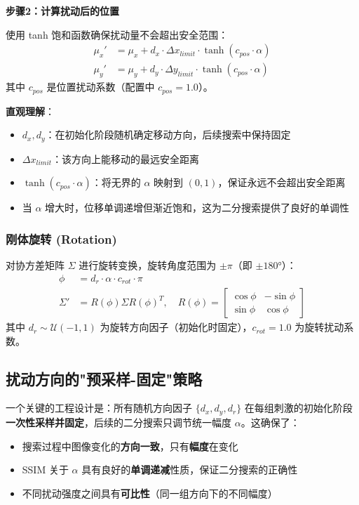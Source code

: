 \documentclass{article}
\begin{document}
\textbf{步骤2：计算扰动后的位置}

使用 tanh 饱和函数确保扰动量不会超出安全范围：
\begin{align}
\mu_x' &= \mu_x + d_x \cdot \Delta x_{limit} \cdot \tanh(c_{pos} \cdot \alpha) \\
\mu_y' &= \mu_y + d_y \cdot \Delta y_{limit} \cdot \tanh(c_{pos} \cdot \alpha)
\end{align}
其中 $c_{pos}$ 是位置扰动系数（配置中 $c_{pos} = 1.0$）。

\textbf{直观理解}：
\begin{itemize}
    \item $d_x, d_y$：在初始化阶段随机确定移动方向，后续搜索中保持固定
    \item $\Delta x_{limit}$：该方向上能移动的最远安全距离
    \item $\tanh(c_{pos} \cdot \alpha)$：将无界的 $\alpha$ 映射到 $(0, 1)$，保证永远不会超出安全距离
    \item 当 $\alpha$ 增大时，位移单调递增但渐近饱和，这为二分搜索提供了良好的单调性
\end{itemize}

\subsubsection{刚体旋转 (Rotation)}
对协方差矩阵 $\Sigma$ 进行旋转变换，旋转角度范围为 $\pm\pi$（即 $\pm 180°$）：
\begin{align}
\phi &= d_r \cdot \alpha \cdot c_{rot} \cdot \pi \\
\Sigma' &= R(\phi) \Sigma R(\phi)^T, \quad R(\phi) = \begin{bmatrix} \cos\phi & -\sin\phi \\ \sin\phi & \cos\phi \end{bmatrix}
\end{align}
其中 $d_r \sim \mathcal{U}(-1,1)$ 为旋转方向因子（初始化时固定），$c_{rot} = 1.0$ 为旋转扰动系数。

\subsection{扰动方向的"预采样-固定"策略}
\label{sec:delta-strategy}
一个关键的工程设计是：所有随机方向因子 $\{d_x, d_y, d_r\}$ 在每组刺激的初始化阶段\textbf{一次性采样并固定}，后续的二分搜索只调节统一幅度 $\alpha$。这确保了：
\begin{itemize}
    \item 搜索过程中图像变化的\textbf{方向一致}，只有\textbf{幅度}在变化
    \item SSIM 关于 $\alpha$ 具有良好的\textbf{单调递减}性质，保证二分搜索的正确性
    \item 不同扰动强度之间具有\textbf{可比性}（同一组方向下的不同幅度）
\end{itemize}
\end{document}
